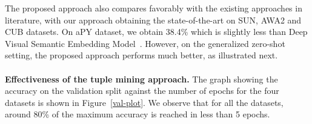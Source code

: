 \documentclass[10pt,twocolumn,letterpaper]{article}
\begin{document}
The proposed approach also compares favorably with the existing approaches in literature, with our approach obtaining the state-of-the-art on SUN, AWA2 and CUB datasets. %
On aPY dataset, we obtain 38.4\% which is slightly less than Deep Visual Semantic Embedding Model~\cite{frome2013devise}. 
However, on the generalized zero-shot setting, the proposed approach performs much better, as illustrated next.\\\\
\textbf{Effectiveness of the tuple mining approach.} The graph showing the accuracy on the validation split against the number of epochs for the four datasets is shown in Figure~\ref{val-plot}. 
We observe that for all the datasets, around 80\% of the maximum accuracy is reached in less than 5 epochs. 
 
\end{document}
